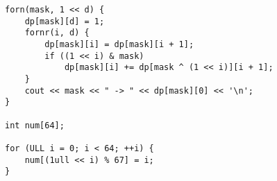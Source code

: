 \begin{verbatim}
forn(mask, 1 << d) {
	dp[mask][d] = 1;
	fornr(i, d) {
		dp[mask][i] = dp[mask][i + 1];
		if ((1 << i) & mask)
			dp[mask][i] += dp[mask ^ (1 << i)][i + 1];
	}
	cout << mask << " -> " << dp[mask][0] << '\n';
}

int num[64];

for (ULL i = 0; i < 64; ++i) {
	num[(1ull << i) % 67] = i;
}
\end{verbatim}
